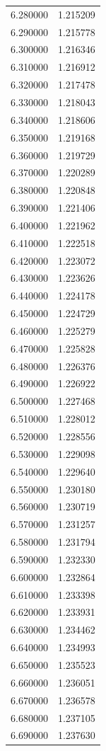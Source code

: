 \begin{tabular}{rr}
6.280000 & 1.215209 \\
6.290000 & 1.215778 \\
6.300000 & 1.216346 \\
6.310000 & 1.216912 \\
6.320000 & 1.217478 \\
6.330000 & 1.218043 \\
6.340000 & 1.218606 \\
6.350000 & 1.219168 \\
6.360000 & 1.219729 \\
6.370000 & 1.220289 \\
6.380000 & 1.220848 \\
6.390000 & 1.221406 \\
6.400000 & 1.221962 \\
6.410000 & 1.222518 \\
6.420000 & 1.223072 \\
6.430000 & 1.223626 \\
6.440000 & 1.224178 \\
6.450000 & 1.224729 \\
6.460000 & 1.225279 \\
6.470000 & 1.225828 \\
6.480000 & 1.226376 \\
6.490000 & 1.226922 \\
6.500000 & 1.227468 \\
6.510000 & 1.228012 \\
6.520000 & 1.228556 \\
6.530000 & 1.229098 \\
6.540000 & 1.229640 \\
6.550000 & 1.230180 \\
6.560000 & 1.230719 \\
6.570000 & 1.231257 \\
6.580000 & 1.231794 \\
6.590000 & 1.232330 \\
6.600000 & 1.232864 \\
6.610000 & 1.233398 \\
6.620000 & 1.233931 \\
6.630000 & 1.234462 \\
6.640000 & 1.234993 \\
6.650000 & 1.235523 \\
6.660000 & 1.236051 \\
6.670000 & 1.236578 \\
6.680000 & 1.237105 \\
6.690000 & 1.237630 \\

\end{tabular}
